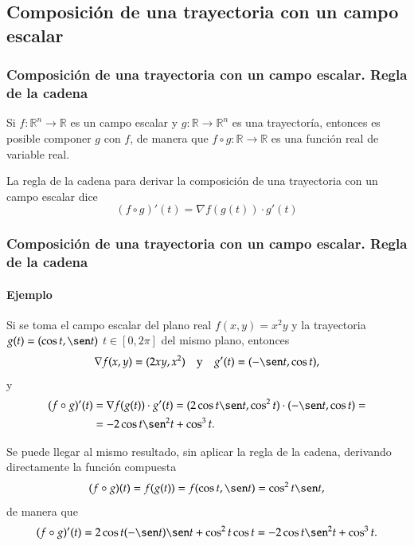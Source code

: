 \subsection{Composición de una trayectoria con un campo escalar}
\begin{frame}
\frametitle{Composición de una trayectoria con un campo escalar. Regla de la cadena}
Si $f:\mathbb{R}^n\rightarrow \mathbb{R}$ es un campo escalar y $g:\mathbb{R}\rightarrow \mathbb{R}^n$ es una
trayectoría, entonces es posible componer $g$ con $f$, de manera que $f\circ g:\mathbb{R}\rightarrow \mathbb{R}$ es una
función real de variable real.

La regla de la cadena para derivar la composición de una trayectoria con un campo escalar dice 
\[
(f\circ g)'(t) = \nabla f(g(t))\cdot g'(t) 
\]  
\end{frame}


\begin{frame}
\frametitle{Composición de una trayectoria con un campo escalar. Regla de la cadena}
\framesubtitle{Ejemplo}
Si se toma el campo escalar del plano real $f(x,y)=x^2y$ y la trayectoria $g(t)=(\cos t,\sen t)$ $t\in [0,2\pi]$ del mismo plano, entonces
\[
\nabla f(x,y) = (2xy, x^2) \quad  \mbox{y} \quad g'(t) = (-\sen t, \cos t),
\]
y 
\begin{align*}
(f\circ g)'(t) &= \nabla f(g(t))\cdot g'(t) = (2\cos t\sen t,\cos^2 t)\cdot (-\sen t,\cos t) =\\
&= -2\cos t\sen^2 t+\cos^3 t.
\end{align*}

Se puede llegar al mismo resultado, sin aplicar la regla de la cadena, derivando directamente la función compuesta
\[
(f\circ g)(t) = f(g(t)) = f(\cos t, \sen t) = \cos^2 t\sen t,
\]
de manera que
\[
(f\circ g)'(t) = 2\cos t(-\sen t)\sen t+\cos^2 t \cos t = -2\cos t\sen^2 t+\cos^3 t.
\]
\end{frame}


